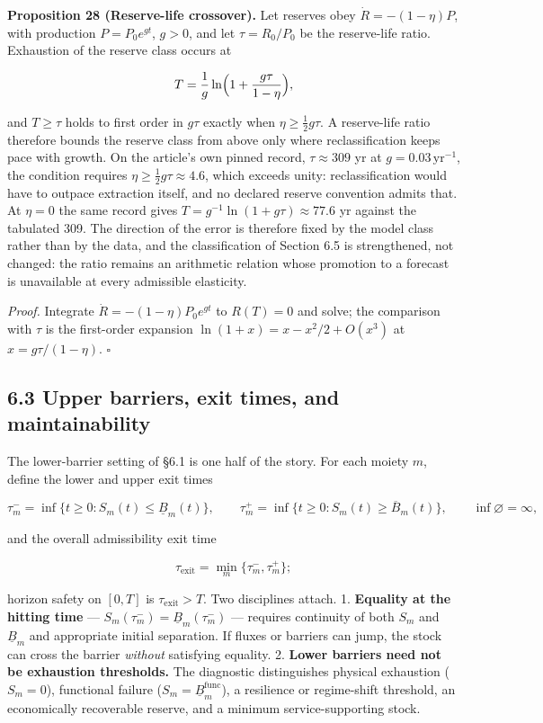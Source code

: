 \documentclass[11pt]{article}
\begin{document}
\textbf{Proposition 28 (Reserve-life crossover).} Let reserves obey \(\dot R=-(1-\eta)P\), with production \(P=P_0e^{gt}\), \(g>0\), and let \(\tau=R_0/\allowbreak{}P_0\) be the reserve-life ratio. Exhaustion of the reserve class occurs at 

$$T=\frac1g\ln\Bigl(1+\frac{g\tau}{1-\eta}\Bigr),$$

 and \(T\ge\tau\) holds to first order in \(g\tau\) exactly when \(\eta\ge\tfrac12g\tau\). A reserve-life ratio therefore bounds the reserve class from above only where reclassification keeps pace with growth. On the article's own pinned record, \(\tau\approx309\) yr at \(g=0.03\,\mathrm{yr}^{-1}\), the condition requires \(\eta\ge\tfrac12g\tau\approx4.6\), which exceeds unity: reclassification would have to outpace extraction itself, and no declared reserve convention admits that. At \(\eta=0\) the same record gives \(T=\allowbreak{}g^{-1}\ln(1+\allowbreak{}g\tau)\approx77.6\) yr against the tabulated 309. The direction of the error is therefore fixed by the model class rather than by the data, and the classification of Section 6.5 is strengthened, not changed: the ratio remains an arithmetic relation whose promotion to a forecast is unavailable at every admissible elasticity.

\emph{Proof.} Integrate \(\dot R=-(1-\eta)P_0e^{gt}\) to \(R(T)=0\) and solve; the comparison with \(\tau\) is the first-order expansion \(\ln(1+\allowbreak{}x)=\allowbreak{}x-x^2/\allowbreak{}2+\allowbreak{}O(x^3)\) at \(x=g\tau/(1-\eta)\). \(\square\)

\subsection*{6.3 Upper barriers, exit times, and maintainability}\label{63-upper-barriers-exit-times-and-maintainability}

The lower-barrier setting of \S6.1 is one half of the story. For each moiety \(m\), define the lower and upper exit times 

$$\tau_m^- = \inf\{ t \ge 0 : S_m(t) \le \underline{B}_m(t) \}, \qquad \tau_m^+ = \inf\{ t \ge 0 : S_m(t) \ge \overline{B}_m(t) \}, \qquad \inf\varnothing = \infty,$$

 and the overall admissibility exit time 

$$\tau_{\mathrm{exit}} = \min_m \{ \tau_m^-, \tau_m^+ \};$$

 horizon safety on \([0,T]\) is \(\tau_{\mathrm{exit}} > T\). Two disciplines attach. 1. \textbf{Equality at the hitting time} --- \(S_m(\tau_m^-)=\allowbreak{}\underline B_m(\tau_m^-)\) --- requires continuity of both \(S_m\) and \(\underline B_m\) and appropriate initial separation. If fluxes or barriers can jump, the stock can cross the barrier \emph{without} satisfying equality. 2. \textbf{Lower barriers need not be exhaustion thresholds.} The diagnostic distinguishes physical exhaustion (\(S_m=0\)), functional failure (\(S_m=\allowbreak{}\underline B_m^{\mathrm{func}}\)), a resilience or regime-shift threshold, an economically recoverable reserve, and a minimum service-supporting stock.
\end{document}
